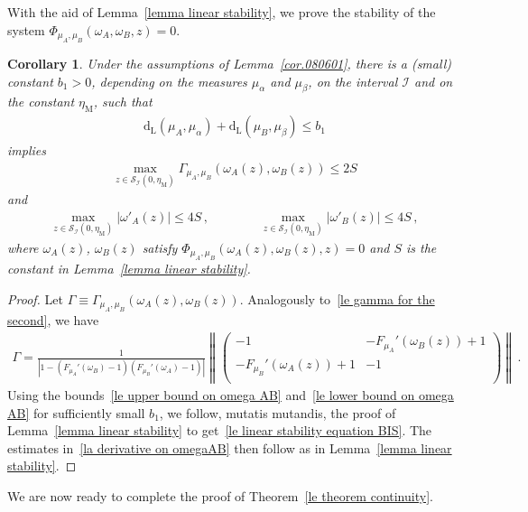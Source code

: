 \documentclass[10pt,reqno]{amsart}
\numberwithin{equation}{section}
\theoremstyle{plain}
\newtheorem{corollary}[theorem]{Corollary}
\numberwithin{kevin}{section}
\theoremstyle{remark}
\newcommand{\PP}{\Phi}
\newcommand{\dL}{\mathrm{d}_{\mathrm{L}}}
\begin{document}
With the aid of Lemma~\ref{lemma linear stability}, we prove the stability of the system $\PP_{\mu_A,\mu_B}(\omega_A,\omega_B,z)=0$.

\begin{corollary} \label{cor081501} Under the assumptions of Lemma~\ref{cor.080601}, there is a (small) constant $b_1>0$, depending on the measures $\mu_\alpha$ and $\mu_\beta$, on the interval $\mathcal{I}$ and on the constant $\eta_{\mathrm{M}}$, such that
\begin{align}\label{le zgs condition}
  \dL(\mu_A,\mu_\alpha)+\dL(\mu_B,\mu_\beta)\le b_1
\end{align}
implies
\begin{align}\label{le linear stability equation BIS}
\max_{z\in\mathcal{S}_{\mathcal{I}}(0,\eta_{\mathrm{M}})}\Gamma_{\mu_A,\mu_B}(\omega_A(z),\omega_B(z))\le 2 S
\end{align}
and 
\begin{align}\label{la derivative on omegaAB}
 \max_{z\in\mathcal{S}_{\mathcal{I}}(0,\eta_{\mathrm{M}})}|\omega'_A(z)|\le 4S\,,\qquad\qquad \max_{z\in\mathcal{S}_{\mathcal{I}}(0,\eta_{\mathrm{M}})}|\omega'_B(z)|\le 4S\,,
\end{align}
where $\omega_A(z)$, $\omega_B(z)$ satisfy $\PP_{\mu_A,\mu_B}(\omega_A(z),\omega_B(z),z)=0$ and $S$ is the constant in Lemma~\ref{lemma linear stability}.
\end{corollary}
\begin{proof}
Let $\Gamma\equiv \Gamma_{\mu_A,\mu_B}(\omega_A(z),\omega_B(z))$. Analogously to~\eqref{le gamma for the second}, we have
\small
\begin{align}
 \Gamma=\frac{1}{\left|1-(F_{\mu_A}'(\omega_B)-1) (F_{\mu_B}'(\omega_A)-1) \right|}\left\|\left( \begin{array}{cc}
 -1& -F_{\mu_A}'(\omega_B(z))+1  \\
 -F_{\mu_B}'(\omega_A(z))+1 & -1\\
   \end{array} \right) \right\|\,.
\end{align}\normalsize
Using the bounds~\eqref{le upper bound on omega AB} and~\eqref{le lower bound on omega AB} for sufficiently small $b_1$, we follow, mutatis mutandis, the proof of Lemma~\ref{lemma linear stability} to get~\eqref{le linear stability equation BIS}. The estimates in~\eqref{la derivative on omegaAB} then follow as in Lemma~\ref{lemma linear stability}.
  \qedhere\end{proof}
 We are now ready to complete the proof of Theorem~\ref{le theorem continuity}.
 
\end{document}

